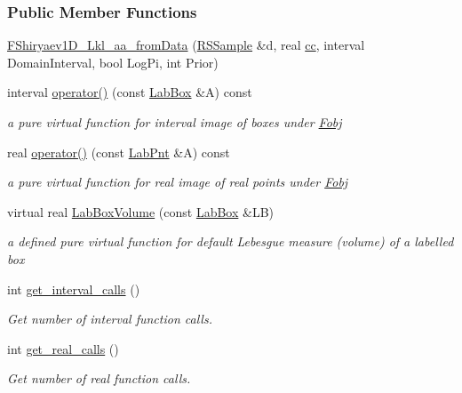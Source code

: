 \subsubsection*{\-Public \-Member \-Functions}
\begin{DoxyCompactItemize}
\item 
\hyperlink{classFShiryaev1D__Lkl__aa__fromData_aef5ea1fbdc387780a35129766d3ffeb1}{\-F\-Shiryaev1\-D\-\_\-\-Lkl\-\_\-aa\-\_\-from\-Data} (\hyperlink{classRSSample}{\-R\-S\-Sample} \&d, real \hyperlink{classFShiryaev1D__Lkl__aa__fromData_a1790f5e4dfc6d207371994c04e154c21}{cc}, interval \-Domain\-Interval, bool \-Log\-Pi, int \-Prior)
\item 
interval \hyperlink{classFShiryaev1D__Lkl__aa__fromData_ac3ef0d8ca7ece7015c1c79af2a85e261}{operator()} (const \hyperlink{classLabBox}{\-Lab\-Box} \&\-A) const 
\begin{DoxyCompactList}\small\item\em a pure virtual function for interval image of boxes under \hyperlink{classFobj}{\-Fobj} \end{DoxyCompactList}\item 
real \hyperlink{classFShiryaev1D__Lkl__aa__fromData_aa14358629387c248e96ccc8183fa9353}{operator()} (const \hyperlink{classLabPnt}{\-Lab\-Pnt} \&\-A) const 
\begin{DoxyCompactList}\small\item\em a pure virtual function for real image of real points under \hyperlink{classFobj}{\-Fobj} \end{DoxyCompactList}\item 
virtual real \hyperlink{classFShiryaev1D__Lkl__aa__fromData_ace0761a116e45f3f924903e355742486}{\-Lab\-Box\-Volume} (const \hyperlink{classLabBox}{\-Lab\-Box} \&\-L\-B)
\begin{DoxyCompactList}\small\item\em a defined pure virtual function for default \-Lebesgue measure (volume) of a labelled box \end{DoxyCompactList}\item 
int \hyperlink{classFShiryaev1D__Lkl__aa__fromData_af64393de70c67faba8af5f5e8aade1cb}{get\-\_\-interval\-\_\-calls} ()
\begin{DoxyCompactList}\small\item\em \-Get number of interval function calls. \end{DoxyCompactList}\item 
int \hyperlink{classFShiryaev1D__Lkl__aa__fromData_a1b055fdade523cb5df05994c9a565f2f}{get\-\_\-real\-\_\-calls} ()
\begin{DoxyCompactList}\small\item\em \-Get number of real function calls. \end{DoxyCompactList}\end{DoxyCompactItemize}
